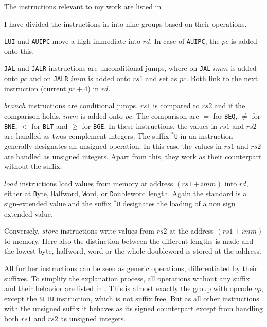 The instructions relevant to my work are listed in


I have divided the instructions in 
into nine groups based on their operations.

\texttt{LUI} and \texttt{AUIPC} move a high immediate into $rd$. In
case of \texttt{AUIPC}, the $pc$ is added onto this.

\texttt{JAL} and \texttt{JALR} instructions are unconditional jumps,
where on \texttt{JAL} $imm$ is added onto $pc$ and on \texttt{JALR}
$imm$ is added onto $rs1$ and set as $pc$. Both link to the next
instruction (current $pc + 4$) in $rd$.

$branch$ instructions are conditional jumps. $rs1$ is compared to
$rs2$ and if the comparison holds, $imm$ is added onto $pc$. The
comparison are $=$ for \texttt{BEQ}, $\neq$ for \texttt{BNE}, $<$ for
\texttt{BLT} and $\ge$ for \texttt{BGE}. In these instructions, the
values in $rs1$ and $rs2$ are handled as twos complement integers.
The suffix \texttt{$^*$U} in an instruction generally designates an
unsigned operation. In this case the values in $rs1$ and $rs2$ are
handled as unsigned integers. Apart from this, they work as their
counterpart without the suffix.

$load$ instructions load values from memory at address $(rs1+imm)$
into $rd$, either at \texttt{B}yte, \texttt{H}alfword, \texttt{W}ord,
or \texttt{D}oubleword length. Again the standard is a sign-extended
value and the suffix \texttt{$^*$U} designates the loading of a non
sign extended value.

Conversely, $store$ instructions write values from $rs2$ at the
address $(rs1+imm)$ to memory. Here also the distinction between the
different lengths is made and the lowest byte, halfword, word or the
whole doubleword is stored at the address.

All further instructions can be seen as generic operations,
differentiated by their suffixes. To simplify the explanation
process, all operations without any suffix and their behavior are
listed in . This is almost exactly the group
with opcode $op$, except the \texttt{SLTU} instruction, which is not
suffix free. But as all other instructions with the unsigned suffix
it behaves as its signed counterpart except from handling both $rs1$
and $rs2$ as unsigned integers.



